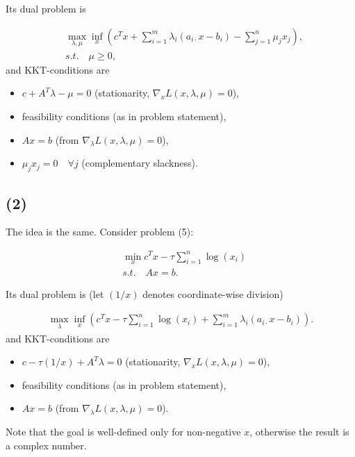 \documentclass[a4paper,12pt,russian]{extreport}
\begin{document}
Its dual problem is 

\begin{align*}
&\max_{\lambda,\mu} \inf_x \left( c^Tx +\sum_{i=1}^m \lambda_i(a_{i\cdot}x-b_i) - \sum_{j=1}^n\mu_jx_j \right),\\
&s.t. \quad \mu\geq 0,
\end{align*}
and KKT-conditions are
\begin{itemize}
\item $c+A^T\lambda-\mu =0$ (stationarity, $\nabla_x L(x,\lambda,\mu)=0$),
\item feasibility conditions (as in problem statement),
\item $Ax=b$ (from $\nabla_\lambda L(x,\lambda,\mu)=0 $),
\item $\mu_jx_j=0 \quad \forall j$ (complementary slackness).
\end{itemize}

\subsection*{(2)}

The idea is the same. Consider problem (5):

\begin{align*}
&\min_x c^Tx - \tau\sum_{i=1}^n \log(x_i)\\
&s.t.\quad Ax=b.
\end{align*}

Its dual problem is (let $(1/x)$ denotes coordinate-wise division)

\begin{align*}
\max_{\lambda} \inf_x \left( c^Tx -\tau\sum_{i=1}^n \log(x_i) +\sum_{i=1}^m \lambda_i(a_{i\cdot}x-b_i) \right).
\end{align*}
and KKT-conditions are
\begin{itemize}
\item $c-\tau(1/x)+A^T\lambda =0$ (stationarity, $\nabla_x L(x,\lambda,\mu)=0$),
\item feasibility conditions (as in problem statement),
\item $Ax=b$ (from $\nabla_\lambda L(x,\lambda,\mu)=0 $).
\end{itemize}

Note that the goal is well-defined only for non-negative $x$, otherwise the result is a complex number.
\end{document}
